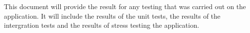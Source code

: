 \documentclass[11pt,fleqn,twoside]{article}
\begin{document}
\wordcount{}

\mmp

\setcounter{tocdepth}{3} %

This document will provide the result for any testing that was carried out on the application. It will include the results of the unit tests, the results of the intergration tests and the results of stress testing the application.


\end{document}
